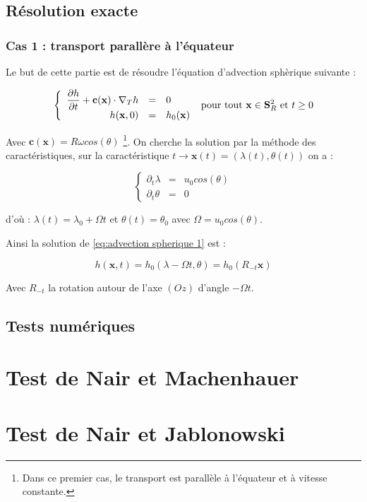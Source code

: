 \subsection{Résolution exacte}

\subsubsection{Cas 1 : transport parallère à l'équateur}

Le but de cette partie est de résoudre l'équation d'advection sphèrique suivante :

\begin{equation}
\label{eq:advection spherique 1}
\left\lbrace
\begin{array}{r cl}
\dfrac{\partial h}{\partial t} + \mathbf{c} ( \mathbf{x} ) \cdot \nabla_ T h & = & 0 \\
h(\mathbf{x},0) & = & h_0 ( \mathbf{x} )
\end{array}
\right. \text{ pour tout } \mathbf{x} \in \mathbf{S}_R^2 \text{ et } t \geq 0
\end{equation}

Avec $\mathbf{c} ( \mathbf{x} ) = R \omega cos ( \theta )$ \footnote{Dans ce premier cas, le transport est parallèle à l'équateur et à vitesse constante.}.
On cherche la solution par la méthode des caractéristiques, sur la caractéristique $t \rightarrow\mathbf{x}(t) = (\lambda (t), \theta(t) )$ on a :

\begin{equation}
\left\lbrace
\begin{array}{rcl}
\partial_t \lambda & = & u_0 cos ( \theta ) \\
\partial_t \theta & = & 0
\end{array}
\right.
\end{equation}

d'où : $\lambda(t) = \lambda_0 + \Omega t$ et $\theta(t) = \theta_0$ avec $\Omega = u_0 cos ( \theta )$.

Ainsi la solution de \eqref{eq:advection spherique 1} est :

\begin{equation}
h( \mathbf{x}, t ) = h_0 ( \lambda - \Omega t, \theta ) = h_0 ( R_{-t}  \mathbf{x} )
\end{equation}

Avec $R_{-t}$ la rotation autour de l'axe $(Oz)$ d'angle $-\Omega t$.


\subsection{Tests numériques}

\section{Test de Nair et Machenhauer}

\section{Test de Nair et Jablonowski}